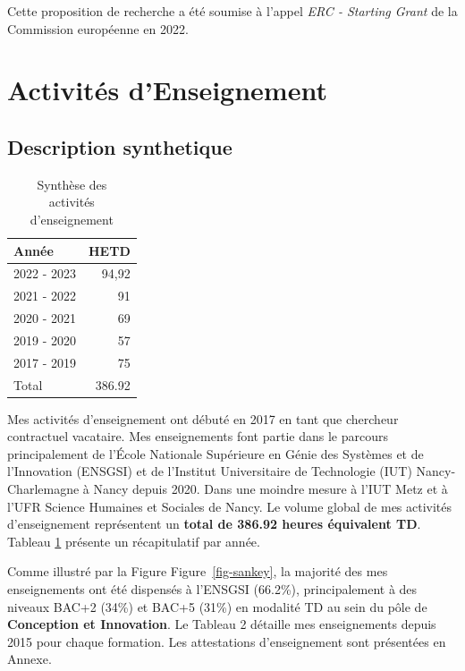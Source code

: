 \documentclass[
  11pt,
]{article}
\begin{document}
Cette proposition de recherche a été soumise à l'appel \emph{ERC -
Starting Grant} de la Commission européenne en 2022.

\newpage

\hypertarget{activituxe9s-denseignement}{%
\section{Activités d'Enseignement}\label{activituxe9s-denseignement}}

\hypertarget{description-synthetique}{%
\subsection{Description synthetique}\label{description-synthetique}}

\begin{table}
   \caption{\label{tbl-heures}Synthèse des\\activités d'enseignement}
   \begin{tabular}[t]{lr}
   \toprule
   Année & HETD\\
   \midrule
   2022 - 2023 & 94,92\\
   2021 - 2022 & 91\\
   2020 - 2021 & 69\\
   2019 - 2020 & 57\\
   2017 - 2019 & 75\\ \midrule
   Total & 386.92 \\
   \bottomrule
   \end{tabular}
\end{table}

Mes activités d'enseignement ont débuté en 2017 en tant que chercheur
contractuel vacataire. Mes enseignements font partie dans le parcours
principalement de l'École Nationale Supérieure en Génie des Systèmes et
de l'Innovation (ENSGSI) et de l'Institut Universitaire de Technologie
(IUT) Nancy-Charlemagne à Nancy depuis 2020. Dans une moindre mesure à
l'IUT Metz et à l'UFR Science Humaines et Sociales de Nancy. Le volume
global de mes activités d'enseignement représentent un \textbf{total de
386.92 heures équivalent TD}. Tableau \ref{tbl-heures} présente un
récapitulatif par année.

Comme illustré par la Figure Figure~\ref{fig-sankey}, la majorité des
mes enseignements ont été dispensés à l'ENSGSI (66.2\%), principalement
à des niveaux BAC+2 (34\%) et BAC+5 (31\%) en modalité TD au sein du
pôle de \textbf{Conception et Innovation}. Le Tableau 2 détaille mes
enseignements depuis 2015 pour chaque formation. Les attestations
d'enseignement sont présentées en Annexe.
\end{document}
